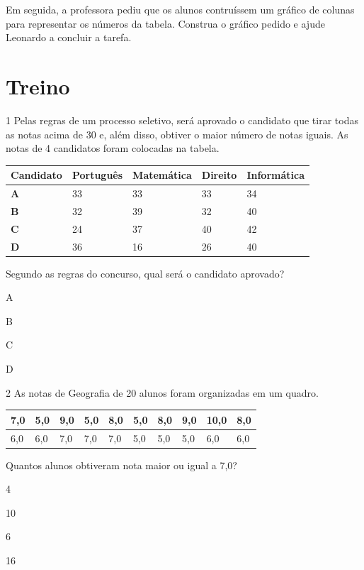 Em seguida, a professora pediu que os alunos contruíssem um gráfico de
colunas para representar os números da tabela. Construa o gráfico pedido
e ajude Leonardo a concluir a tarefa.

\begin{mdframed}[linewidth=2pt,linecolor=salmao]
\vspace{12cm}
\end{mdframed}

\pagebreak
\section*{Treino}

\num{1} Pelas regras de um processo seletivo, será aprovado 
o candidato que tirar todas as notas acima de 30 e, além disso, obtiver o maior
número de notas iguais. As notas de 4 candidatos foram colocadas na
tabela.

\begin{longtable}[]{@{}lllll@{}}
\toprule
\hline
\textbf{Candidato} & \textbf{Português} & \textbf{Matemática} & \textbf{Direito} &
\textbf{Informática}\tabularnewline
\midrule
\endhead
\textbf{A} & 33 & 33 & 33 & 34\tabularnewline
\hline
\textbf{B} & 32 & 39 & 32 & 40\tabularnewline
\hline
\textbf{C} & 24 & 37 & 40 & 42\tabularnewline
\hline
\textbf{D} & 36 & 16 & 26 & 40\tabularnewline
\hline
\bottomrule
\end{longtable}

Segundo as regras do concurso, qual será o candidato aprovado?

\begin{escolha}
\item
  A
\item
  B
\item
  C
\item
  D
\end{escolha}


\num{2} As notas de Geografia de 20 alunos foram organizadas em um quadro.

\begin{longtable}[]{@{}llllllllll@{}}
\toprule
7,0 & 5,0 & 9,0 & 5,0 & 8,0 & 5,0 & 8,0 & 9,0 & 10,0 &
8,0\tabularnewline
\midrule
\endhead
6,0 & 6,0 & 7,0 & 7,0 & 7,0 & 5,0 & 5,0 & 5,0 & 6,0 & 6,0\tabularnewline
\bottomrule
\end{longtable}

Quantos alunos obtiveram nota maior ou igual a 7,0?

\begin{multicols}{2}
\begin{escolha}
\item
  4
\item
  10
\item
  6
\item
  16
\end{escolha}
\end{multicols}


